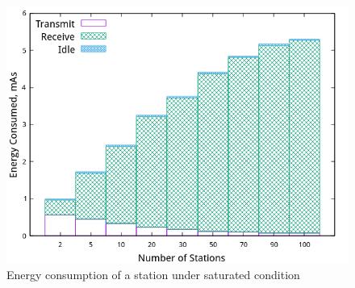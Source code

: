 \begin{figure}[!h]
\centering
\includegraphics[scale=0.85]{./figure/chp1/n_energy_partition.png}
\caption{Energy consumption of a station under saturated condition}
\label{fig_eng}
\end{figure}


\vspace*{0.5cm}

